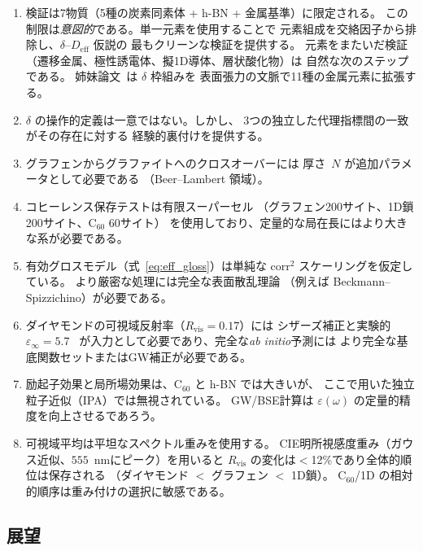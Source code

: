 \documentclass[twocolumn,showpacs,preprintnumbers,amsmath,amssymb,prb]{revtex4-2}
\begin{document}
\begin{enumerate}
  \item 検証は7物質（5種の炭素同素体 + h-BN + 金属基準）に限定される。
    この制限は\emph{意図的}である。単一元素を使用することで
    元素組成を交絡因子から排除し、$\delta$--$D_\mathrm{eff}$ 仮説の
    最もクリーンな検証を提供する。
    元素をまたいだ検証（遷移金属、極性誘電体、擬1D導体、層状酸化物）は
    自然な次のステップである。
    姉妹論文~\cite{SentoOpticsPaper2}は $\delta$ 枠組みを
    表面張力の文脈で11種の金属元素に拡張する。
  \item $\delta$ の操作的定義は一意ではない。しかし、
    3つの独立した代理指標間の一致がその存在に対する
    経験的裏付けを提供する。
  \item グラフェンからグラファイトへのクロスオーバーには
    厚さ~$N$ が追加パラメータとして必要である
    （Beer--Lambert 領域）。
  \item コヒーレンス保存テストは有限スーパーセル
    （グラフェン200サイト、1D鎖200サイト、C$_{60}$ 60サイト）
    を使用しており、定量的な局在長にはより大きな系が必要である。
  \item 有効グロスモデル（式~\ref{eq:eff_gloss}）は単純な
    $\mathrm{corr}^2$ スケーリングを仮定している。
    より厳密な処理には完全な表面散乱理論
    （例えば Beckmann--Spizzichino）が必要である。
  \item ダイヤモンドの可視域反射率（$R_\mathrm{vis} = 0.17$）には
    シザーズ補正と実験的 $\varepsilon_\infty = 5.7$~\cite{Palik1998}
    が入力として必要であり、完全な\emph{ab initio}予測には
    より完全な基底関数セットまたはGW補正が必要である。
  \item 励起子効果と局所場効果は、C$_{60}$ と h-BN では大きいが、
    ここで用いた独立粒子近似（IPA）では無視されている。
    GW/BSE計算は $\varepsilon(\omega)$ の定量的精度を向上させるであろう。
  \item 可視域平均は平坦なスペクトル重みを使用する。
    CIE明所視感度重み（ガウス近似、$555$~nmにピーク）を用いると
    $R_\mathrm{vis}$ の変化は$<$12\%であり全体的順位は保存される
    （ダイヤモンド $<$ グラフェン $<$ 1D鎖）。
    C$_{60}$/1D の相対的順序は重み付けの選択に敏感である。
\end{enumerate}

\subsection{展望}
\end{document}
